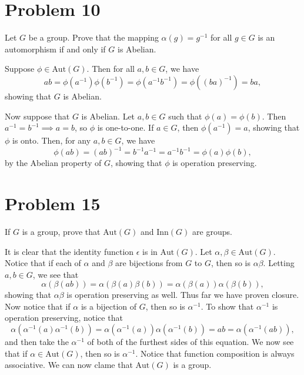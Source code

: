 \documentclass[12pt]{article}
\newcommand{\aut}{\mbox{Aut}}
\newcommand{\inn}{\mbox{Inn}}
\begin{document}
\section*{Problem 10}

Let $G$ be a group.  Prove that the mapping $\alpha(g)=g^{-1}$ for all $g\in G$ is
an automorphism if and only if $G$ is Abelian.

Suppose $\phi\in\aut(G)$.  Then for all $a,b\in G$, we have
\begin{equation*}
ab=\phi(a^{-1})\phi(b^{-1})=\phi(a^{-1}b^{-1})=\phi((ba)^{-1})=ba,
\end{equation*}
showing that $G$ is Abelian.

Now suppose that $G$ is Abelian.  Let $a,b\in G$ such that $\phi(a)=\phi(b)$.
Then $a^{-1}=b^{-1}\implies a=b$, so $\phi$ is one-to-one.
If $a\in G$, then $\phi(a^{-1})=a$, showing that $\phi$ is onto.
Then, for any $a,b\in G$, we have
\begin{equation*}
\phi(ab)=(ab)^{-1}=b^{-1}a^{-1}=a^{-1}b^{-1}=\phi(a)\phi(b),
\end{equation*}
by the Abelian property of $G$, showing that $\phi$ is operation preserving.

\section*{Problem 15}

If $G$ is a group, prove that $\aut(G)$ and $\inn(G)$ are groups.

It is clear that the identity function $\epsilon$ is in $\aut(G)$.
Let $\alpha,\beta\in\aut(G)$.  Notice that if each of $\alpha$ and
$\beta$ are bijections from $G$ to $G$, then so is $\alpha\beta$.
Letting $a,b\in G$, we see that
\begin{equation*}
\alpha(\beta(ab))=\alpha(\beta(a)\beta(b))=\alpha(\beta(a))\alpha(\beta(b)),
\end{equation*}
showing that $\alpha\beta$ is operation preserving as well.
Thus far we have proven closure.  Now notice that if $\alpha$ is
a bijection of $G$, then so is $\alpha^{-1}$.  To show that
$\alpha^{-1}$ is operation preserving, notice that
\begin{equation*}
\alpha(\alpha^{-1}(a)\alpha^{-1}(b))=\alpha(\alpha^{-1}(a))\alpha(\alpha^{-1}(b))=ab=\alpha(\alpha^{-1}(ab)),
\end{equation*}
and then take the $\alpha^{-1}$ of both of the furthest sides of this equation.
We now see that if $\alpha\in\aut(G)$, then so is $\alpha^{-1}$.
Notice that function composition is always associative.  We can now
clame that $\aut(G)$ is a group.
\end{document}
